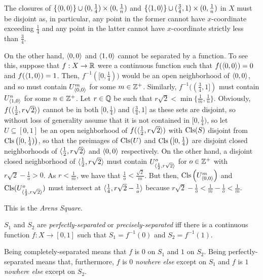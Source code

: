 \begin{exm}
The closures of $\{ \langle0,0\rangle\} \cup (0,\frac{1}{4})\times (0,\frac{1}{n})$ and $\{ \langle1,0\rangle\} \cup (\frac{3}{4},1)\times (0,\frac{1}{n})$ in $X$ must be disjoint as, in particular, any point in the former cannot have $x$-coordinate exceeding $\frac{1}{4}$ and any point in the latter cannot have $x$-coordinate strictly less than $\frac{3}{4}$.

On the other hand, $\langle0,0\rangle$ and $\langle1,0\rangle$ cannot be separated by a function.  To see this, suppose that $f:X\rightarrow \mathbb{R}$ were a continuous function such that $f(\langle0,0\rangle)=0$ and $f(\langle1,0\rangle)=1$.  Then, $f^{-1}([0,\frac{1}{4}))$ would be an open neighborhood of $\langle0,0\rangle$, and so must contain $U_{\langle0,0\rangle}^m$ for some $m\in \mathbb{Z} ^+$.  Similarly, $f^{-1}((\frac{3}{4},1])$ must contain $U_{\langle1,0\rangle}^n$ for some $n\in \mathbb{Z} ^+$.  Let $r\in \mathbb{Q}$ be such that $r\sqrt{2}<\min \{ \frac{1}{m},\frac{1}{n}\}$.  Obviously, $f(\langle\frac{1}{2},r\sqrt{2}\rangle)$ cannot be in both $[0,\frac{1}{4})$ and $(\frac{3}{4},1]$ as these sets are disjoint, so without loss of generality assume that it is not contained in $[0,\frac{1}{4})$, so let $U \subseteq [0,1]$ be an open neighborhood of $f(\langle\frac{1}{2},r\sqrt{2}\rangle)$ with $\operatorname{Cls} (S)$ disjoint from $\operatorname{Cls} \left( [0,\frac{1}{4})\right) $, so that the preimages of $\operatorname{Cls} (U)$ and $\operatorname{Cls} \left( [0,\frac{1}{4}\right)$ are disjoint closed neighborhoods of $\langle\frac{1}{2},r\sqrt{2}\rangle$ and $\langle0,0\rangle$ respectively.  On the other hand, a disjoint closed neighborhood of $\langle\frac{1}{2},r\sqrt{2}\rangle$ must contain $U_{\langle\frac{1}{2},r\sqrt{2}\rangle}^o$ for $o\in \mathbb{Z} ^+$ with $r\sqrt{2}-\frac{1}{o}>0$.  As $r<\frac{1}{m}$, we have that $\frac{1}{o}<\frac{\sqrt{2}}{m}$.  But then, $\operatorname{Cls} \left( U_{\langle0,0\rangle}^m\right)$ and $\operatorname{Cls} (U_{\langle\frac{1}{2},r\sqrt{2}\rangle}^o)$ must intersect at $\langle\frac{1}{4},r\sqrt{2}-\frac{1}{o}\rangle$ because $r\sqrt{2}-\frac{1}{o}<\frac{1}{m}-\frac{1}{o}<\frac{1}{m}$.
\begin{rmk}
This is the \emph{Arens Square}.
\end{rmk}
\end{exm}
\begin{dfn}
$S_1$ and $S_2$ are \emph{perfectly-separated} or \emph{precisely-separated} iff there is a continuous function $f:X\rightarrow [0,1]$ such that $S_1=f^{-1}(0)$ and $S_2=f^{-1}(1)$.
\begin{rmk}
Being completely-separated means that $f$ is $0$ on $S_1$ and $1$ on $S_2$.  Being perfectly-separated means that, furthermore, $f$ is $0$ \emph{nowhere else} except on $S_1$ and $f$ is $1$ \emph{nowhere else} except on $S_2$.
\end{rmk}
\end{dfn}
